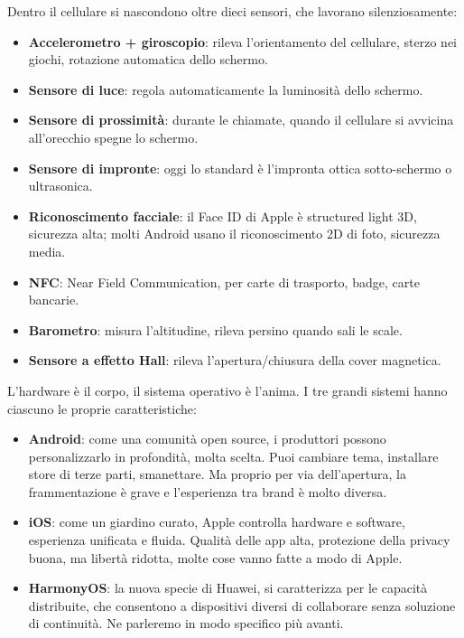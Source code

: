 
Dentro il cellulare si nascondono oltre dieci sensori, che lavorano silenziosamente:

\begin{itemize}
  \item \textbf{Accelerometro + giroscopio}: rileva l'orientamento del cellulare, sterzo nei giochi, rotazione automatica dello schermo.
  \item \textbf{Sensore di luce}: regola automaticamente la luminosità dello schermo.
  \item \textbf{Sensore di prossimità}: durante le chiamate, quando il cellulare si avvicina all'orecchio spegne lo schermo.
  \item \textbf{Sensore di impronte}: oggi lo standard è l'impronta ottica sotto-schermo o ultrasonica.
  \item \textbf{Riconoscimento facciale}: il Face ID di Apple è structured light 3D, sicurezza alta; molti Android usano il riconoscimento 2D di foto, sicurezza media.
  \item \textbf{NFC}: Near Field Communication, per carte di trasporto, badge, carte bancarie.
  \item \textbf{Barometro}: misura l'altitudine, rileva persino quando sali le scale.
  \item \textbf{Sensore a effetto Hall}: rileva l'apertura/chiusura della cover magnetica.
\end{itemize}


L'hardware è il corpo, il sistema operativo è l'anima. I tre grandi sistemi hanno ciascuno le proprie caratteristiche:

\begin{itemize}
  \item \textbf{Android}: come una comunità open source, i produttori possono personalizzarlo in profondità, molta scelta. Puoi cambiare tema, installare store di terze parti, smanettare. Ma proprio per via dell'apertura, la frammentazione è grave e l'esperienza tra brand è molto diversa.
  \item \textbf{iOS}: come un giardino curato, Apple controlla hardware e software, esperienza unificata e fluida. Qualità delle app alta, protezione della privacy buona, ma libertà ridotta, molte cose vanno fatte a modo di Apple.
  \item \textbf{HarmonyOS}: la nuova specie di Huawei, si caratterizza per le capacità distribuite, che consentono a dispositivi diversi di collaborare senza soluzione di continuità. Ne parleremo in modo specifico più avanti.
\end{itemize}

